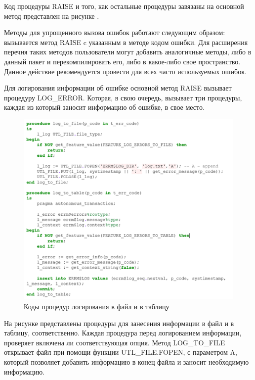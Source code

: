 Код процедуры RAISE и того, как остальные процедуры завязаны на основной метод представлен на рисунке . 

Методы для упрощенного вызова ошибок работают следующим образом: вызывается метод RAISE c указанным в методе кодом ошибки. Для расширения перечня таких методов пользователи могут добавить аналогичные методы, либо в данный пакет и перекомпилировать его, либо в какое-либо свое пространство. Данное действие рекомендуется провести для всех часто используемых ошибок. 

Для логирования информации об ошибке основной метод RAISE вызывает процедуру LOG\_ERROR. Которая, в свою очередь, вызывает три процедуры, каждая из который заносит информацию об ошибке, в свое место. 

\begin{figure}[ht!] 
	\center
	\includegraphics [scale=1] {my_folder/img/c3_log_to_file_code.png}
	\caption{Коды процедур логирования в файл и в таблицу} 
	\label{fig:c3_log_to_file_code}  
\end{figure}
\FloatBarrier

На рисунке  представлены процедуры для занесения информации в файл и в таблицу, соответственно. Каждая процедура перед логированием информации, проверяет включена ли соответствующая опция. Метод LOG\_TO\_FILE открывает файл при помощи функции UTL\_FILE.FOPEN, с параметром A, который позволяет добавить информацию в конец файла и заносит необходимую информацию. 

